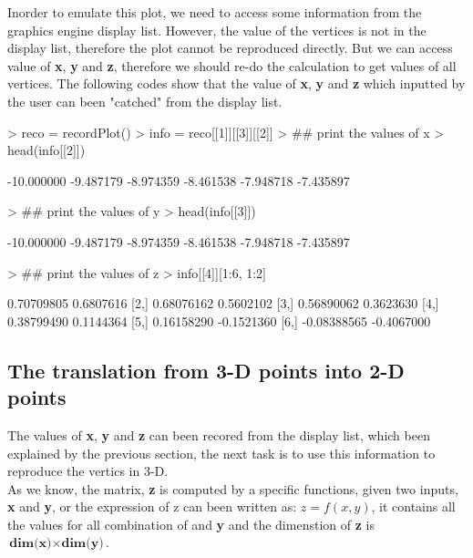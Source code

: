 \documentclass[paper=a4, fontsize=11pt]{report}
\begin{document}
Inorder to emulate this plot, we need to access some information from the graphics engine display list. However, the value of the vertices is not in the display list, therefore the plot cannot be reproduced directly. But we can access value of \textbf{x}, \textbf{y} and \textbf{z}, therefore we should re-do the calculation to get values of all vertices. The following codes show that the value of \textbf{x}, \textbf{y} and \textbf{z} which inputted by the user can been "catched" from the display list.
\begin{Schunk}
\begin{Sinput}
> reco = recordPlot()
> info = reco[[1]][[3]][[2]]
> ## print the values of x
> head(info[[2]])
\end{Sinput}
\begin{Soutput}
[1] -10.000000  -9.487179  -8.974359  -8.461538  -7.948718  -7.435897
\end{Soutput}
\begin{Sinput}
> ## print the values of y
> head(info[[3]])
\end{Sinput}
\begin{Soutput}
[1] -10.000000  -9.487179  -8.974359  -8.461538  -7.948718  -7.435897
\end{Soutput}
\begin{Sinput}
> ## print the values of z
> info[[4]][1:6, 1:2]
\end{Sinput}
\begin{Soutput}
            [,1]       [,2]
[1,]  0.70709805  0.6807616
[2,]  0.68076162  0.5602102
[3,]  0.56890062  0.3623630
[4,]  0.38799490  0.1144364
[5,]  0.16158290 -0.1521360
[6,] -0.08388565 -0.4067000
\end{Soutput}
\end{Schunk}
\subsection{The translation from 3-D points into 2-D points}
The values of \textbf{x}, \textbf{y} and \textbf{z} can been recored from the display list, which been explained by the previous section, the next task is to use this information to reproduce the vertics in 3-D.\\

As we know, the matrix, \textbf{z} is computed by a specific functions, given two inputs, \textbf{x} and \textbf{y}, or the expression of z can been written as: $z = f(x,y)$, it contains all the values for all combination of  and \textbf{y} and the dimenstion of \textbf{z} is $ \textbf{dim(x)} \times \textbf{dim(y)}$.\\
\end{document}
